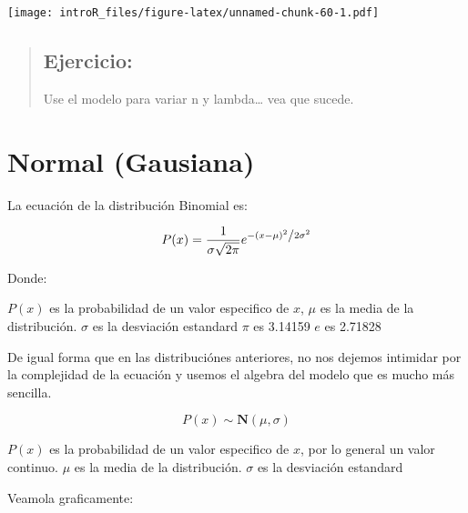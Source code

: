 \documentclass[
]{book}
\begin{document}
\texttt{[image: introR\_files/figure-latex/unnamed-chunk-60-1.pdf]}

\begin{quote}
\hypertarget{ejercicio-7}{%
\subsection{Ejercicio:}\label{ejercicio-7}}

Use el modelo para variar n y lambda\ldots{} vea que sucede.
\end{quote}

\hypertarget{normal-gausiana}{%
\section{Normal (Gausiana)}\label{normal-gausiana}}

La ecuación de la distribución Binomial es:

\begin{equation} 
P(x) = \frac{1}{{\sigma \sqrt {2\pi } }}e^{{{ - \left( {x - \mu } \right)^2 } \mathord{\left/ {\vphantom {{ - \left( {x - \mu } \right)^2 } {2\sigma ^2 }}} \right. \kern-\nulldelimiterspace} {2\sigma ^2 }}}
  \label{eq:binom}
\end{equation}

Donde:

\(P(x)\) es la probabilidad de un valor especifico de \(x\),
\(\mu\) es la media de la distribución.
\(\sigma\) es la desviación estandard
\(\pi\) es 3.14159
\(e\) es 2.71828

De igual forma que en las distribuciónes anteriores, no nos dejemos intimidar por la complejidad de la ecuación y usemos el algebra del modelo que es mucho más sencilla.

\begin{equation} 
  P\left( x \right) \sim \mathbf{N}(\mu, \sigma)
  \label{eq:binom}
\end{equation}

\(P(x)\) es la probabilidad de un valor especifico de \(x\), por lo general un valor continuo.
\(\mu\) es la media de la distribución.
\(\sigma\) es la desviación estandard

Veamola graficamente:
\end{document}
